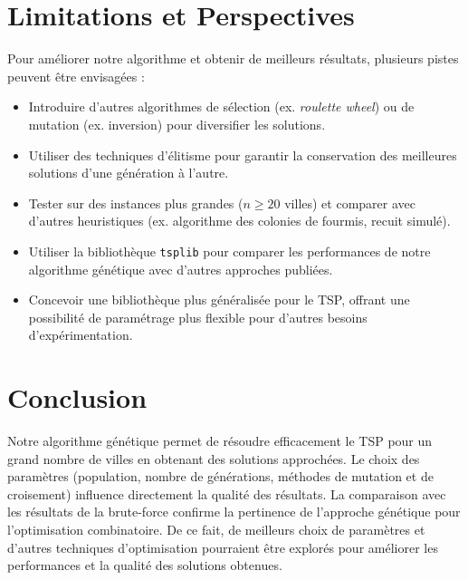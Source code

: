 \documentclass[a4paper,12pt]{article}
\begin{document}
\section{Limitations et Perspectives}
Pour améliorer notre algorithme et obtenir de meilleurs résultats, plusieurs pistes peuvent être envisagées :
\begin{itemize}
    \item Introduire d'autres algorithmes de sélection (ex. \emph{roulette wheel}) ou de mutation (ex. inversion) pour diversifier les solutions.
    \item Utiliser des techniques d'élitisme pour garantir la conservation des meilleures solutions d'une génération à l'autre.
    \item Tester sur des instances plus grandes ($n \geq 20$ villes) et comparer avec d'autres heuristiques (ex. algorithme des colonies de fourmis, recuit simulé).
    \item Utiliser la bibliothèque \texttt{tsplib} \cite{tsblib} pour comparer les performances de notre algorithme génétique avec d'autres approches publiées.
    \item Concevoir une bibliothèque plus généralisée pour le TSP, offrant une possibilité de paramétrage plus flexible pour d'autres besoins d'expérimentation.
\end{itemize}

\section{Conclusion}
Notre algorithme génétique permet de résoudre efficacement le TSP pour un grand nombre de villes en obtenant des solutions approchées. Le choix des paramètres (population, nombre de générations, méthodes de mutation et de croisement) influence directement la qualité des résultats. La comparaison avec les résultats de la brute-force confirme la pertinence de l’approche génétique pour l’optimisation combinatoire.
De ce fait, de meilleurs choix de paramètres et d'autres techniques d'optimisation pourraient être explorés pour améliorer les performances et la qualité des solutions obtenues.

\nocite{*} %
 

\end{document}
